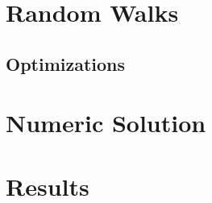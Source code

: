 \documentclass{article}
\begin{document}
\section{Random Walks}
	
	\subsection{Optimizations}

\section{Numeric Solution}

\section{Results}



\end{document}

